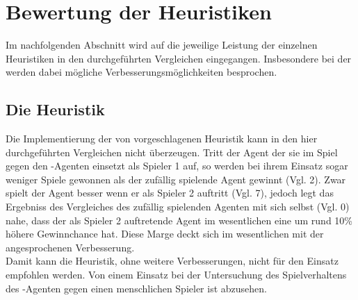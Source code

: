 \section{Bewertung der Heuristiken}
\label{sect:Fazit:Heuristiken}
Im nachfolgenden Abschnitt wird auf die jeweilige Leistung der einzelnen Heuristiken in den durchgeführten Vergleichen eingegangen. Insbesondere bei der  werden dabei mögliche Verbesserungsmöglichkeiten besprochen.  
\subsection{Die Heuristik }
Die Implementierung der von \cite{nijssen_2007} vorgeschlagenen Heuristik kann in den hier durchgeführten Vergleichen nicht überzeugen. Tritt der Agent der sie im Spiel gegen den -Agenten einsetzt als Spieler 1 auf, so werden bei ihrem Einsatz sogar weniger Spiele gewonnen als der zufällig spielende Agent gewinnt (Vgl. 2). Zwar spielt der Agent besser wenn er als Spieler 2 auftritt (Vgl. 7), jedoch legt das Ergebniss des Vergleiches des zufällig spielenden Agenten mit sich selbst (Vgl. 0) nahe, dass der als Spieler 2 auftretende Agent im wesentlichen eine um rund 10\% höhere Gewinnchance hat. Diese Marge deckt sich im wesentlichen mit der angesprochenen Verbesserung.
\\Damit kann die Heuristik, ohne weitere Verbesserungen, nicht für den Einsatz empfohlen werden. Von einem Einsatz bei der Untersuchung des Spielverhaltens des -Agenten gegen einen menschlichen Spieler ist abzusehen. 
